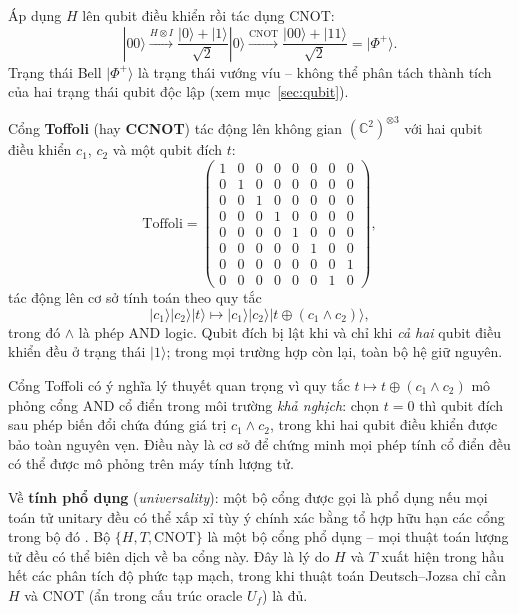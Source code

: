 \begin{example}
\label{ex:bell}
Áp dụng $H$ lên qubit điều khiển rồi tác dụng CNOT:
$$|00\rangle \xrightarrow{H \otimes I}
  \frac{|0\rangle+|1\rangle}{\sqrt{2}}|0\rangle
  \xrightarrow{\mathrm{CNOT}}
  \frac{|00\rangle+|11\rangle}{\sqrt{2}} = |\Phi^+\rangle.$$
Trạng thái Bell $|\Phi^+\rangle$ là trạng thái vướng víu -- không thể phân tách
thành tích của hai trạng thái qubit độc lập (xem mục~\ref{sec:qubit}).
\end{example}

\begin{definition}
\label{def:toffoli}
Cổng \textbf{Toffoli} (hay \textbf{CCNOT}) tác động lên không gian
$(\mathbb{C}^2)^{\otimes 3}$ với hai qubit điều khiển $c_1$, $c_2$ và một qubit
đích $t$:
$$\mathrm{Toffoli} =
\begin{pmatrix}
1&0&0&0&0&0&0&0\\
0&1&0&0&0&0&0&0\\
0&0&1&0&0&0&0&0\\
0&0&0&1&0&0&0&0\\
0&0&0&0&1&0&0&0\\
0&0&0&0&0&1&0&0\\
0&0&0&0&0&0&0&1\\
0&0&0&0&0&0&1&0
\end{pmatrix},$$
tác động lên cơ sở tính toán theo quy tắc
$$|c_1\rangle|c_2\rangle|t\rangle
  \mapsto |c_1\rangle|c_2\rangle|t \oplus (c_1 \wedge c_2)\rangle,$$
trong đó $\wedge$ là phép AND logic. Qubit đích bị lật khi và chỉ khi
\emph{cả hai} qubit điều khiển đều ở trạng thái $|1\rangle$; trong mọi trường
hợp còn lại, toàn bộ hệ giữ nguyên.
\end{definition}

\begin{remark}
Cổng Toffoli có ý nghĩa lý thuyết quan trọng vì quy tắc
$t \mapsto t \oplus (c_1 \wedge c_2)$ mô phỏng cổng AND cổ điển trong môi trường
\emph{khả nghịch}: chọn $t = 0$ thì qubit đích sau phép biến đổi chứa đúng giá
trị $c_1 \wedge c_2$, trong khi hai qubit điều khiển được bảo toàn nguyên vẹn.
Điều này là cơ sở để chứng minh mọi phép tính cổ điển đều có thể được mô phỏng
trên máy tính lượng tử.

Về \textbf{tính phổ dụng} (\textit{universality}): một bộ cổng được gọi là phổ
dụng nếu mọi toán tử unitary đều có thể xấp xỉ tùy ý chính xác bằng tổ hợp hữu
hạn các cổng trong bộ đó \cite{ref5}. Bộ $\{H, T, \mathrm{CNOT}\}$ là một bộ
cổng phổ dụng -- mọi thuật toán lượng tử đều có thể biên dịch về ba cổng này.
Đây là lý do $H$ và $T$ xuất hiện trong hầu hết các phân tích độ phức tạp mạch,
trong khi thuật toán Deutsch--Jozsa chỉ cần $H$ và $\mathrm{CNOT}$ (ẩn trong
cấu trúc oracle $U_f$) là đủ.
\end{remark}

